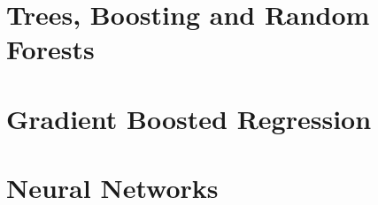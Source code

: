 \chapter{Trees, Boosting and Random Forests}

\chapter{Gradient Boosted Regression}

\chapter{Neural Networks}

